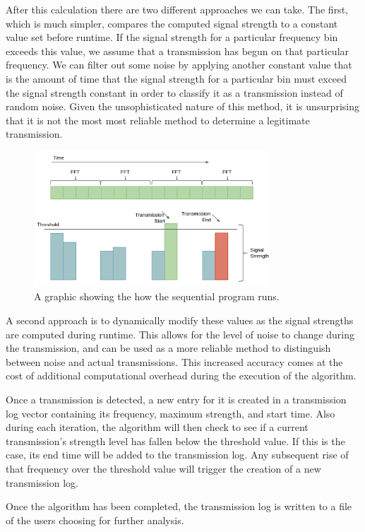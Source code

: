 \documentclass[conference]{IEEEtran}
\begin{document}
After this calculation there are two different approaches we can take. The first,
which is much simpler, compares the computed signal strength to a constant value
set before runtime. If the signal strength for a particular frequency bin exceeds
this value, we assume that a transmission has begun on that particular frequency.
We can filter out some noise by applying another constant value that is the 
amount of time that the signal strength for a particular bin must exceed the 
signal strength constant in order to classify it as a transmission instead of 
random noise.
Given the unsophisticated nature of this method, it is unsurprising that it is not
the most most reliable method to determine a legitimate transmission.

\begin{figure}[ht!]
\centering
\includegraphics[width=3.5in]{sequentialgraphic.png}
\caption{A graphic showing the how the sequential program runs.}
\label{fig:pipeline}
\end{figure}

A second approach is to dynamically modify these values as the signal strengths
are computed during runtime. This allows for the level of noise to change during
the transmission, and can be used as a more reliable method to distinguish between
noise and actual transmissions. This increased accuracy comes at the cost of
additional computational overhead during the execution of the algorithm.

Once a transmission is detected, a new entry for it is created in a transmission log vector
containing its frequency, maximum strength, and start time. Also during each iteration,
the algorithm will then check to see if a current transmission's strength level
has fallen below the threshold value. If this is the case, its end time will
be added to the transmission log. Any subsequent rise of that frequency over the
threshold value will trigger the creation of a new transmission log.

Once the algorithm has been completed, the transmission log is written to a file
of the users choosing for further analysis.
\end{document}
